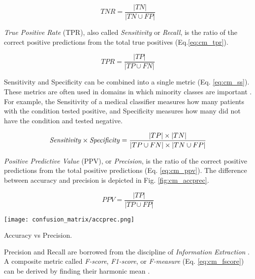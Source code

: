 \begin{equation}
\label{eq:cm_tnr}
TNR = \frac{|TN|}{|TN \cup FP|}
\end{equation}

\textit{True Positive Rate} (TPR), also called \textit{Sensitivity} or \textit{Recall}, is the ratio of the correct positive predictions from the total true positives (Eq.\ref{eq:cm_tpr}).

\begin{equation}
\label{eq:cm_tpr}
TPR = \frac{|TP|}{|TP \cup FN|}
\end{equation}

Sensitivity and Specificity can be combined into a single metric (Eq. \ref{eq:cm_ss}). These metrics are often used in  domains in which minority classes are important \citep{kuhn2013applied}. For example, the Sensitivity of a medical classifier \citep{el2010hybrid} measures how many patients with the condition tested positive, and Specificity measures how many did not have the condition and tested negative.

\begin{equation}
\label{eq:cm_ss}
\textnormal{\textit{Sensitivity}} \times \textnormal{\textit{Specificity}} = \frac{|TP| \times |TN|}{|TP \cup FN| \times |TN \cup FP|}
\end{equation}

\textit{Positive Predictive Value} (PPV), or \textit{Precision}, is the ratio of the correct positive predictions from the total positive predictions (Eq. \ref{eq:cm_ppv}). The difference between accuracy and precision is depicted in Fig. \ref{fig:cm_accprec}.

\begin{equation}
\label{eq:cm_ppv}
PPV = \frac{|TP|}{|TP \cup FP|}
\end{equation}

\begin{marginfigure}
  \texttt{[image: confusion\_matrix/accprec.png]}
  \caption{Accuracy vs Precision.}
  \label{fig:cm_accprec}
\end{marginfigure}

Precision and Recall are borrowed from the discipline of \textit{Information Extraction} \citep{sokolova2009systematic}. A composite metric called \textit{F-score}, \textit{F1-score}, or \textit{F-measure} (Eq. \ref{eq:cm_fscore}) can be derived by finding their harmonic mean \citep{kelleher2015fundamentals}.

